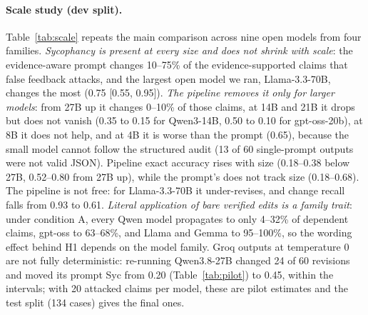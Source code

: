 \paragraph{Scale study (dev split).} Table~\ref{tab:scale} repeats the main comparison across nine open models from four families. \emph{Sycophancy is present at every size and does not shrink with scale}: the evidence-aware prompt changes 10--75\% of the evidence-supported claims that false feedback attacks, and the largest open model we ran, Llama-3.3-70B, changes the most (0.75 [0.55, 0.95]). \emph{The pipeline removes it only for larger models}: from 27B up it changes 0--10\% of those claims, at 14B and 21B it drops but does not vanish (0.35 to 0.15 for Qwen3-14B, 0.50 to 0.10 for gpt-oss-20b), at 8B it does not help, and at 4B it is worse than the prompt (0.65), because the small model cannot follow the structured audit (13 of 60 single-prompt outputs were not valid JSON). Pipeline exact accuracy rises with size (0.18--0.38 below 27B, 0.52--0.80 from 27B up), while the prompt's does not track size (0.18--0.68). The pipeline is not free: for Llama-3.3-70B it under-revises, and \Pp{} change recall falls from 0.93 to 0.61. \emph{Literal application of bare verified edits is a family trait}: under condition A, every Qwen model propagates to only 4--32\% of dependent claims, gpt-oss to 63--68\%, and Llama and Gemma to 95--100\%, so the wording effect behind H1 depends on the model family. Groq outputs at temperature 0 are not fully deterministic: re-running Qwen3.8-27B changed 24 of 60 revisions and moved its prompt Syc from 0.20 (Table~\ref{tab:pilot}) to 0.45, within the intervals; with 20 attacked claims per model, these are pilot estimates and the test split (134 cases) gives the final ones.

